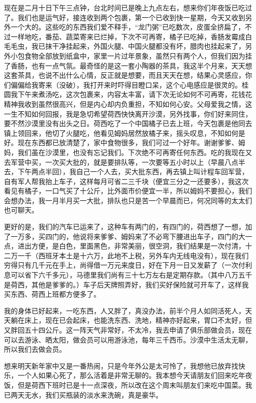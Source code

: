 \par {}
\par 现在是二月十日下午三点钟，台北时间已是晚上九点左右，想来你们年夜饭已吃过了。我们也是运气好，接连收到两个包裹，第一个已收到快一星期，今天又收到另外一个大的。这些吃的东西我们爱不释手，“龙门粥”已吃数次，皮蛋全挤扁了，不过一样地吃，番茄、蔬菜寄来已烂掉，下次不可再寄，橘子已吃掉，香肠发霉成白毛毛虫，我已抹干净挂起来，外国火腿、中国火腿都没有坏，腊肉也挂起来了，另外小包食物全部放到纸盒中，家里一片过年景象，虽然只有两个人，但我们因为挂了香肠，也有一点气氛。最奇怪的是这一套小陶器的茶具，我这半个月来，天天想这套茶具，也说不出什么心情，反正就是想要，而且天天在想，结果心灵感应，你们偏偏给我寄来（没破），我打开来时吓得目瞪口呆，这个心电感应是很灵的。桂圆我下午来煮汤吃，这次包裹来，内容太丰富，请下次无论如何不可再寄，花钱花精神我收到虽然很高兴，但是内心却内负重担，不知如何心安。父母爱我之情，这一生不知如何回报，我是急切希望荷西快快离开沙漠，另外找事，你们好来同住，要不然沙漠里没有出头之日。荷西吃了一个中国橘子已去上班，今天包裹是他同去镇上领回来，他切了火腿吃，他看见姆妈居然放橘子来，摇头叹息，不知如何是好。现在东西都已放清楚了，家中食物很多，我们可过一个好年。谢谢爹爹、姆妈，我们虽在沙漠里，也没有忘记我们。下次绝不可再寄任何东西。吃的我现在又去军营中买，一次买大批的，就是要排队等，一次要等五小时以上（早晨八点半去，下午两点半回），我自己一个人去，买大批东西，再去镇上叫计程车回军营，自有军人帮我抬上车子，这样每月可省二三千块（便宜三分之一还要多），我这次看见有橘子，一口气买了十公斤，比外面市价便宜一半，所以姆妈不要担心，我们会想办法，我一月半月买一大批，排队也只是苦一个早晨而已，何况同等的太太们也可聊天。
\par 更好的是，我们的汽车已运来了，这种车有两门的，有四门的，荷西想了一想，加了一万多，买四门的，他说将来爹爹、姆妈来了不必弯下腰进出车子，四门的大一点，进出方便，是白色，里面黑色，非常美丽，很空洞，我们结果是一次付清，十二万一千（西班牙本土是十六万，此地不上税，另外车内无线电没有），现在我们穷得只有几千元在手上，尚得借一万元来度日，好在下月一日又发薪了（一次付利息可以省下六千多元），马德里我们尚有三十七万左右是定期存款。（其中八万五千是荷西，其他是爹爹的。）车子后天牌照弄好，我们买好保险就可开车了，这样我买东西、荷西上班都方便多了。
\par 我的身体已好起来，一吃东西，人又胖了，真没办法，前半个月人如同活死人，天天躺在床上，现在已会起床，也能洗东西、洗地，精神亦好起来，胃口不太好，但又胖回五十四公斤。这一阵天气非常好，不太冷，我去申请了俱乐部做会员，现在可以去游泳、晒太阳，做会员可以用游泳池，每年三千西币。沙漠中生活太无聊，所以我们去做会员。
\par 想来明天新年家中又是一番热闹，只是今年外公是太可怜了，我想他已放弃找快乐，一个人如果心死了，那么活着是非常无聊的。我本想今天请朋友们回来吃年夜饭，但是荷西下班时已是十一点深夜，所以改在这个周末叫朋友们来吃中国菜。我已两天无水，我们买瓶装的淡水来洗碗，真是豪华。
